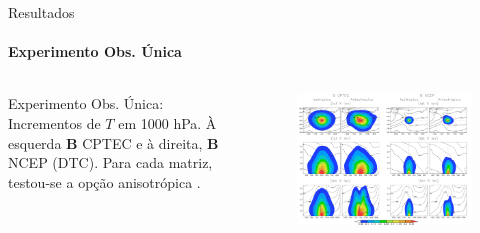 \documentclass[10pt,aspectratio=169]{beamer}
\begin{document}
\begin{frame}[fragile]{Resultados}
\framesubtitle{Experimento Obs. Única}
	\vspace{-2.5em}
	\begin{columns}
    	\begin{column}{0.35\textwidth} 
			\vspace{-3.75em}
			\begin{block}{Experimento Obs. Única:}
				\vspace{0.5em}
				Incrementos de $T$ em 1000 hPa. À esquerda $\mathbf{B}$ CPTEC e à direita, $\mathbf{B}$ NCEP (DTC). Para cada matriz, testou-se a opção anisotrópica \cite{bastarz/2017}.
			\end{block}
		\end{column}
		\hspace*{2em}
		\begin{column}{0.5\textwidth}
    		\begin{figure}[H]
      			\centering
		        \hspace*{-5.5em}\includegraphics[trim={0 0 0 2.5cm},clip,scale=0.175]{./figs/fig5.pdf}
				\caption{}
			\end{figure}
		\end{column}
	\end{columns}
\end{frame}

\end{document}
